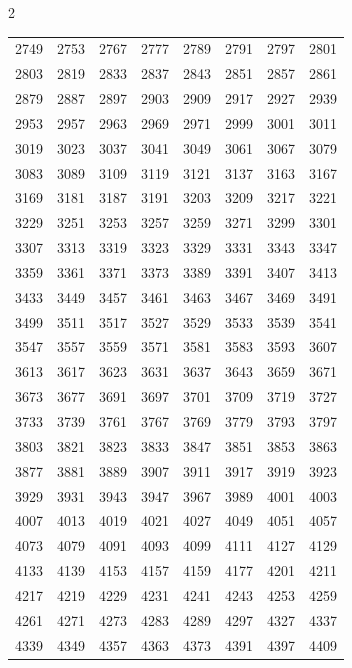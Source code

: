 \documentclass{article}
\begin{document}
\begin{multicols}{2}
\begin{tabular}{r r r r r r r r}
2749 & 2753 & 2767 & 2777 & 2789 & 2791 & 2797 & 2801\\
2803 & 2819 & 2833 & 2837 & 2843 & 2851 & 2857 & 2861\\
2879 & 2887 & 2897 & 2903 & 2909 & 2917 & 2927 & 2939\\
2953 & 2957 & 2963 & 2969 & 2971 & 2999 & 3001 & 3011\\
3019 & 3023 & 3037 & 3041 & 3049 & 3061 & 3067 & 3079\\
3083 & 3089 & 3109 & 3119 & 3121 & 3137 & 3163 & 3167\\
3169 & 3181 & 3187 & 3191 & 3203 & 3209 & 3217 & 3221\\
3229 & 3251 & 3253 & 3257 & 3259 & 3271 & 3299 & 3301\\
3307 & 3313 & 3319 & 3323 & 3329 & 3331 & 3343 & 3347\\
3359 & 3361 & 3371 & 3373 & 3389 & 3391 & 3407 & 3413\\
3433 & 3449 & 3457 & 3461 & 3463 & 3467 & 3469 & 3491\\
3499 & 3511 & 3517 & 3527 & 3529 & 3533 & 3539 & 3541\\
3547 & 3557 & 3559 & 3571 & 3581 & 3583 & 3593 & 3607\\
3613 & 3617 & 3623 & 3631 & 3637 & 3643 & 3659 & 3671\\
3673 & 3677 & 3691 & 3697 & 3701 & 3709 & 3719 & 3727\\
3733 & 3739 & 3761 & 3767 & 3769 & 3779 & 3793 & 3797\\
3803 & 3821 & 3823 & 3833 & 3847 & 3851 & 3853 & 3863\\
3877 & 3881 & 3889 & 3907 & 3911 & 3917 & 3919 & 3923\\
3929 & 3931 & 3943 & 3947 & 3967 & 3989 & 4001 & 4003\\
4007 & 4013 & 4019 & 4021 & 4027 & 4049 & 4051 & 4057\\
4073 & 4079 & 4091 & 4093 & 4099 & 4111 & 4127 & 4129\\
4133 & 4139 & 4153 & 4157 & 4159 & 4177 & 4201 & 4211\\
4217 & 4219 & 4229 & 4231 & 4241 & 4243 & 4253 & 4259\\
4261 & 4271 & 4273 & 4283 & 4289 & 4297 & 4327 & 4337\\
4339 & 4349 & 4357 & 4363 & 4373 & 4391 & 4397 & 4409\\
\end{tabular}


\end{multicols}
\end{document}
